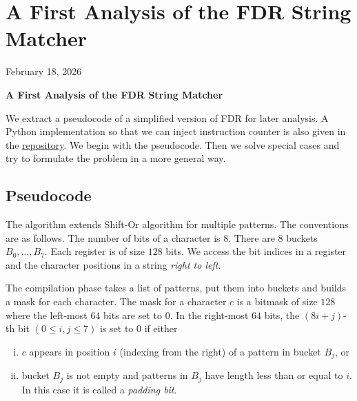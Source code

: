 \chapter{A First Analysis of the FDR String Matcher}

\begin{center}
  February 18, 2026
  \vspace{0.5cm}
\end{center}

\begin{center}
  \vspace{1em}
  \textbf{\Large A First Analysis of the FDR String Matcher}\\
  \vspace{1em}
\end{center}

We extract a pseudocode of a simplified version of FDR for later analysis. A Python implementation so that we can inject instruction counter is also given in the \href{https://github.com/mintcd/string-matchers/tree/main/src/py_fdr}{repository}. We begin with the pseudocode. Then we solve special cases and try to formulate the problem in a more general way.

\section{Pseudocode}

The algorithm extends Shift-Or algorithm for multiple patterns. The conventions are as follows. The number of bits of a character is $8$. There are $8$ buckets $B_0, \ldots, B_7$. Each register is of size $128$ bits. We access the bit indices in a register and the character positions in a string \textit{right to left}.

The compilation phase takes a list of patterns, put them into buckets and builds a mask for each character. The mask for a character $c$ is a bitmask of size $128$ where the left-most $64$ bits are set to $0$. In the right-most $64$ bits, the $(8i+j)$-th bit $(0\le i,j\le 7)$ is set to $0$ if either

\begin{enumerate}[(i)]
  \item $c$ appears in position $i$ (indexing from the right) of a pattern in bucket $B_j$, or
  \item bucket $B_j$ is not empty and patterns in $B_j$ have length less than or equal to $i$. In this case it is called a \textit{padding bit}.
\end{enumerate}

